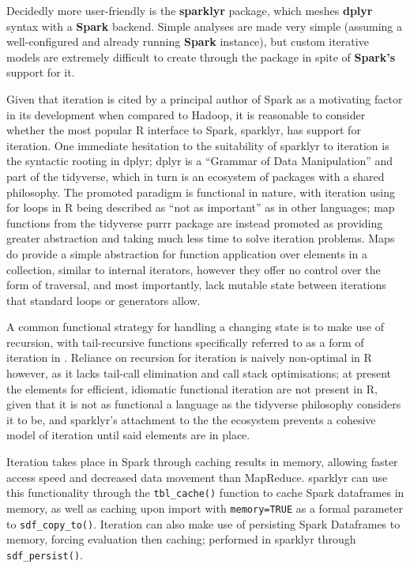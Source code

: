 Decidedly more user-friendly is the \textbf{sparklyr} package, which
meshes \textbf{dplyr} syntax with a \textbf{Spark} backend. Simple
analyses are made very simple (assuming a well-configured and already
running \textbf{Spark} instance), but custom iterative models are
extremely difficult to create through the package in spite of
\textbf{Spark's} support for it.

Given that iteration is cited by a principal author of Spark as a
motivating factor in its development when compared to Hadoop, it is
reasonable to consider whether the most popular R interface to Spark,
sparklyr, has support for
iteration\cite{zaharia2010spark}\cite{luraschi20}. One immediate
hesitation to the suitability of sparklyr to iteration is the syntactic
rooting in dplyr; dplyr is a ``Grammar of Data Manipulation'' and part
of the tidyverse, which in turn is an ecosystem of packages with a
shared philosophy\cite{wickham2019welcome}\cite{wickham2016r}. The
promoted paradigm is functional in nature, with iteration using for
loops in R being described as ``not as important'' as in other
languages; map functions from the tidyverse purrr package are instead
promoted as providing greater abstraction and taking much less time to
solve iteration problems. Maps do provide a simple abstraction for
function application over elements in a collection, similar to internal
iterators, however they offer no control over the form of traversal, and
most importantly, lack mutable state between iterations that standard
loops or generators allow\cite{cousineau1998functional}.

A common functional strategy for handling a changing state is to make
use of recursion, with tail-recursive functions specifically referred to
as a form of iteration in \cite{abelson1996structure}. Reliance on
recursion for iteration is naively non-optimal in R however, as it lacks
tail-call elimination and call stack optimisations\cite{rcore2020lang};
at present the elements for efficient, idiomatic functional iteration
are not present in R, given that it is not as functional a language as
the tidyverse philosophy considers it to be, and sparklyr's attachment
to the the ecosystem prevents a cohesive model of iteration until said
elements are in place.

Iteration takes place in Spark through caching results in memory,
allowing faster access speed and decreased data movement than
MapReduce\cite{zaharia2010spark}. sparklyr can use this functionality
through the \texttt{tbl_cache()} function to
cache Spark dataframes in memory, as well as caching upon import with
\texttt{memory=TRUE} as a formal parameter to
\texttt{sdf_copy_to()}. Iteration can also
make use of persisting Spark Dataframes to memory, forcing evaluation
then caching; performed in sparklyr through
\texttt{sdf_persist()}.

